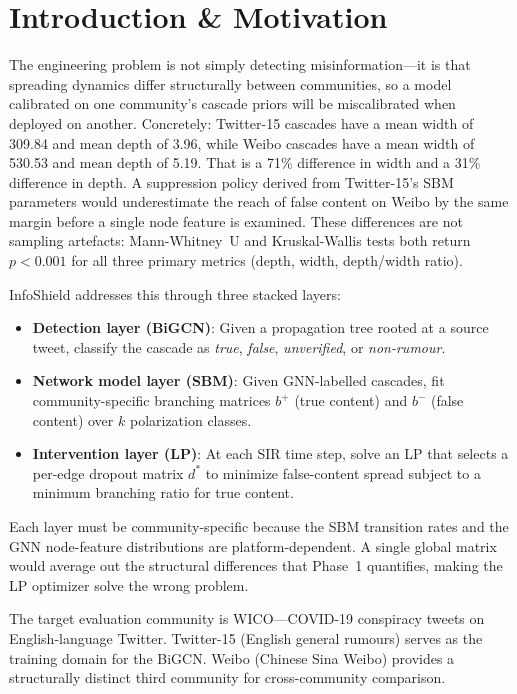 \documentclass[conference]{IEEEtran}
\begin{document}
\section{Introduction \& Motivation}

The engineering problem is not simply detecting misinformation---it is that
spreading dynamics differ structurally between communities, so a model
calibrated on one community's cascade priors will be miscalibrated when
deployed on another.
Concretely: Twitter-15 cascades have a mean width of 309.84 and mean depth of
3.96, while Weibo cascades have a mean width of 530.53 and mean depth of 5.19.
That is a 71\% difference in width and a 31\% difference in depth.
A suppression policy derived from Twitter-15's SBM parameters would
underestimate the reach of false content on Weibo by the same margin before
a single node feature is examined.
These differences are not sampling artefacts: Mann-Whitney~U and
Kruskal-Wallis tests both return \(p < 0.001\) for all three primary metrics
(depth, width, depth/width ratio).

InfoShield addresses this through three stacked layers:

\begin{itemize}
  \item \textbf{Detection layer (BiGCN)}: Given a propagation tree rooted at a
    source tweet, classify the cascade as \textit{true}, \textit{false},
    \textit{unverified}, or \textit{non-rumour}.
  \item \textbf{Network model layer (SBM)}: Given GNN-labelled cascades, fit
    community-specific branching matrices \(b^+\) (true content) and \(b^-\)
    (false content) over \(k\) polarization classes.
  \item \textbf{Intervention layer (LP)}: At each SIR time step, solve an LP
    that selects a per-edge dropout matrix \(d^*\) to minimize false-content
    spread subject to a minimum branching ratio for true content.
\end{itemize}

Each layer must be community-specific because the SBM transition rates and
the GNN node-feature distributions are platform-dependent.
A single global matrix would average out the structural differences that
Phase~1 quantifies, making the LP optimizer solve the wrong problem.

The target evaluation community is WICO---COVID-19 conspiracy tweets on
English-language Twitter.
Twitter-15 (English general rumours) serves as the training domain for the
BiGCN.
Weibo (Chinese Sina Weibo) provides a structurally distinct third community
for cross-community comparison.
\end{document}
